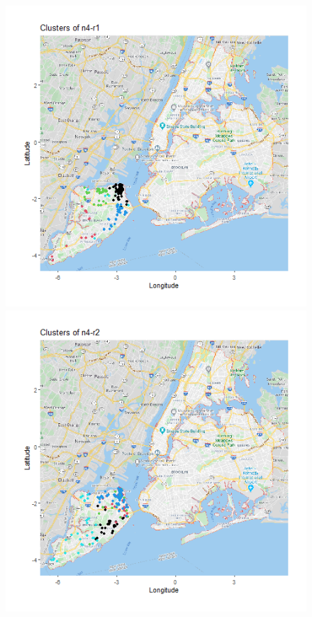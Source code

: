 \documentclass{FR16}
\begin{document}
\begin{figure}[!htb]
   \begin{minipage}{0.33\textwidth}
     \centering
     \includegraphics[width=1\linewidth]{figures/clust-n4-r1.png} 
   \end{minipage}\hfill
   \begin{minipage}{0.33\textwidth}
     \centering
     \includegraphics[width=1\linewidth]{figures/clust-n4-r2.png}

\end{minipage}
\end{figure}
\end{document}
